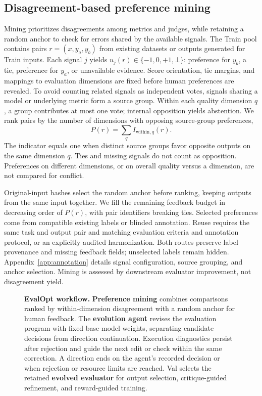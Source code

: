 \subsection{Disagreement-based preference mining}
\label{sec:mining}

Mining prioritizes disagreements among metrics and judges, while retaining a random anchor to check for errors shared by the available signals.
The Train pool contains pairs $r=(x,y_a,y_b)$ from existing datasets or outputs generated for Train inputs.
Each signal $j$ yields $u_j(r)\in\{-1,0,+1,\bot\}$: preference for $y_b$, a tie, preference for $y_a$, or unavailable evidence.
Score orientation, tie margins, and mappings to evaluation dimensions are fixed before human preferences are revealed.
To avoid counting related signals as independent votes, signals sharing a model or underlying metric form a source group.
Within each quality dimension $q$, a group contributes at most one vote; internal opposition yields abstention.
We rank pairs by the number of dimensions with opposing source-group preferences,
\begin{equation}
 P(r)=\sum_q I_{\mathrm{within},q}(r).
 \label{eq:conflict}
\end{equation}
The indicator equals one when distinct source groups favor opposite outputs on the same dimension $q$.
Ties and missing signals do not count as opposition.
Preferences on different dimensions, or on overall quality versus a dimension, are not compared for conflict.

Original-input hashes select the random anchor before ranking, keeping outputs from the same input together.
We fill the remaining feedback budget in decreasing order of $P(r)$, with pair identifiers breaking ties.
Selected preferences come from compatible existing labels or blinded annotation.
Reuse requires the same task and output pair and matching evaluation criteria and annotation protocol, or an explicitly audited harmonization.
Both routes preserve label provenance and missing feedback fields; unselected labels remain hidden.
Appendix~\ref{app:annotation} details signal configuration, source grouping, and anchor selection.
Mining is assessed by downstream evaluator improvement, not disagreement yield.

\begin{figure}[t]
\centering

\caption{\textbf{EvalOpt workflow.}
\textbf{Preference mining} combines comparisons ranked by within-dimension disagreement with a random anchor for human feedback.
The \textbf{evolution agent} revises the evaluation program with fixed base-model weights, separating candidate decisions from direction continuation.
Execution diagnostics persist after rejection and guide the next edit or check within the same correction.
A direction ends on the agent's recorded decision or when rejection or resource limits are reached.
Val selects the retained \textbf{evolved evaluator} for output selection, critique-guided refinement, and reward-guided training.
}
\label{fig:overview}
\end{figure}

